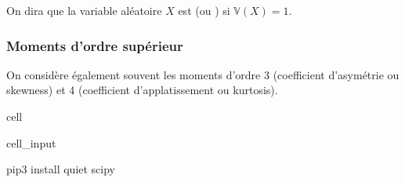 \documentclass[letterpaper,10pt,french]{sphinxmanual}
\begin{document}
\sphinxAtStartPar
On dira que la variable aléatoire \(X\) est  (ou ) si \(\mathbb{V}(X)=1\).


\subsubsection{Moments d’ordre supérieur}
\label{\detokenize{Rappels:moments-d-ordre-superieur}}
\ignorespaces 
{}\ignorespaces 
\sphinxAtStartPar
On considère également souvent les moments d’ordre 3 (coefficient d’asymétrie ou skewness) et 4 (coefficient d’applatissement ou kurtosis).

\sphinxstepscope

\begin{sphinxuseclass}{cell}
\begin{sphinxuseclass}{cell_input}
\begin{sphinxVerbatim}[commandchars=\\\{\}]
      
  
    pip3 install \PYGZhy{}\PYGZhy{}quiet scipy
\end{sphinxVerbatim}

\end{sphinxuseclass}
\end{sphinxuseclass}
\end{document}

